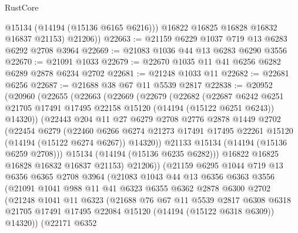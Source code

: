 \begin{lexlean}{RustCore}
\begin{coremodule}
            @15134
            (@14194 (@15136 @6165 @6216)))
          @16822
          @16825
          @16828
          @16832
          @16837
          @21153)
        @21206))
@22663 := @21159 @6229 @1037 @719 @13 @6283 @6292 @2708 @3964
@22669 := @21083 @1036 @44 @13 @6283 @6290 @3556
@22670 := @21091 @1033
@22679 := @22670 @1035 @11 @41 @6256 @6282 @6289 @2878 @6234 @2702
@22681 := @21248 @1033 @11
@22682 := @22681 @6256
@22687 := @21688 @38 @67 @11 @5539 @2817
@22838 := @20952
    (@20960
      (@22655
        (@22663
          (@22669
            (@22679
              (@22682
                (@22687
                  @6242
                  @6251
                  @21705
                  @17491
                  @17495
                  @22158
                  @15120
                  (@14194 (@15122 @6251 @6243))
                  @14320))
              (@22443
                @204
                @11
                @27
                @6279
                @2708
                @2776
                @2878
                @1449
                @2702
                (@22454
                  @6279
                  (@22460
                    @6266
                    @6274
                    @21273
                    @17491
                    @17495
                    @22261
                    @15120
                    (@14194 (@15122 @6274 @6267))
                    @14320))
                @21133
                @15134
                (@14194 (@15136 @6259 @2708)))
              @15134
              (@14194 (@15136 @6235 @6282)))
            @16822
            @16825
            @16828
            @16832
            @16837
            @21153)
          @21206))
      (@21159
        @6295
        @1044
        @719
        @13
        @6356
        @6365
        @2708
        @3964
        (@21083
          @1043
          @44
          @13
          @6356
          @6363
          @3556
          (@21091
            @1041
            @988
            @11
            @41
            @6323
            @6355
            @6362
            @2878
            @6300
            @2702
            (@21248
              @1041
              @11
              @6323
              (@21688
                @76
                @67
                @11
                @5539
                @2817
                @6308
                @6318
                @21705
                @17491
                @17495
                @22084
                @15120
                (@14194 (@15122 @6318 @6309))
                @14320))
            (@22171
              @6352

\end{coremodule}
\end{lexlean}
